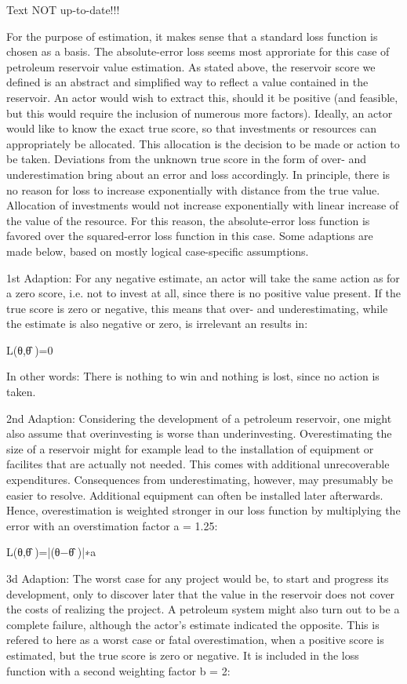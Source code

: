 	Text NOT up-to-date!!!
	
	For the purpose of estimation, it makes sense that a standard loss function is chosen as a basis. The absolute-error loss seems most approriate for this case of petroleum reservoir value estimation. As stated above, the reservoir score we defined is an abstract and simplified way to reflect a value contained in the reservoir. An actor would wish to extract this, should it be positive (and feasible, but this would require the inclusion of numerous more factors). Ideally, an actor would like to know the exact true score, so that investments or resources can appropriately be allocated. This allocation is the decision to be made or action to be taken. Deviations from the unknown true score in the form of over- and underestimation bring about an error and loss accordingly. In principle, there is no reason for loss to increase exponentially with distance from the true value. Allocation of investments would not increase exponentially with linear increase of the value of the resource. For this reason, the absolute-error loss function is favored over the squared-error loss function in this case. Some adaptions are made below, based on mostly logical case-specific assumptions.
	
	    1st Adaption: For any negative estimate, an actor will take the same action as for a zero score, i.e. not to invest at all, since there is no positive value present. If the true score is zero or negative, this means that over- and underestimating, while the estimate is also negative or zero, is irrelevant an results in:
	
	L(θ,θ̂ )=0
	
	In other words: There is nothing to win and nothing is lost, since no action is taken.
	
	    2nd Adaption: Considering the development of a petroleum reservoir, one might also assume that overinvesting is worse than underinvesting. Overestimating the size of a reservoir might for example lead to the installation of equipment or facilites that are actually not needed. This comes with additional unrecoverable expenditures. Consequences from underestimating, however, may presumably be easier to resolve. Additional equipment can often be installed later afterwards. Hence, overestimation is weighted stronger in our loss function by multiplying the error with an overstimation factor a = 1.25:
	
	L(θ,θ̂ )=|(θ−θ̂ )|∗a
	
	    3d Adaption: The worst case for any project would be, to start and progress its development, only to discover later that the value in the reservoir does not cover the costs of realizing the project. A petroleum system might also turn out to be a complete failure, although the actor's estimate indicated the opposite. This is refered to here as a worst case or fatal overestimation, when a positive score is estimated, but the true score is zero or negative. It is included in the loss function with a second weighting factor b = 2:
	
